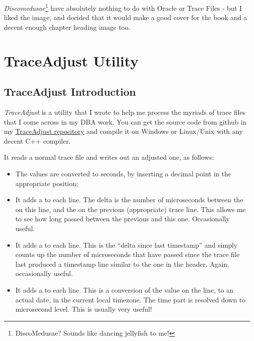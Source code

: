 \begin{appendix}
\emph{Discomedusae}\footnote{DiscoMedusae? Sounds like dancing jellyfish to me!} have absolutely nothing to do with Oracle or Trace Files - but I liked the image, and decided that it would make a good cover for the book and a decent enough chapter heading image too.

\chapter{TraceAdjust Utility}
\label{traceadjust}

\section*{TraceAdjust Introduction}\label{traceadjust-introduction}


\emph{TraceAdjust} is a utility that I wrote to help me process the
myriads of trace files that I come across in my DBA work. You can get
the source code from github in my 
\href{https://github.com/NormanDunbar/TraceAdjust}{TraceAdjust repository} and compile it
on Windows or Linux/Unix with any decent C++ compiler.

It reads a normal trace file and writes out an adjusted one, as follows:

\begin{itemize}
\tightlist
\item
  The  values are converted to seconds, by inserting a
  decimal point in the appropriate position;
\item
  It adds a  to each  line. The delta is
  the number of microseconds between the  on this line,
  and the  on the previous (appropriate) trace line. This
  allows me to see how long passed between the previous 
  and this one. Occasionally useful.
\item
  It adds a  to each  line. This is the
  ``delta since last timestamp'' and simply counts up the number of
  microseconds that have passed since the trace file last produced a
  timestamp line similar to the one in the header. Again, occasionally
  useful.
\item
  It adds a  to each  line. This is a
  conversion of the  value on the line, to an actual
  date, in the current local timezone. The time part is resolved down to
  microsecond level. This is usually very useful!
\end{itemize}


\end{appendix}
